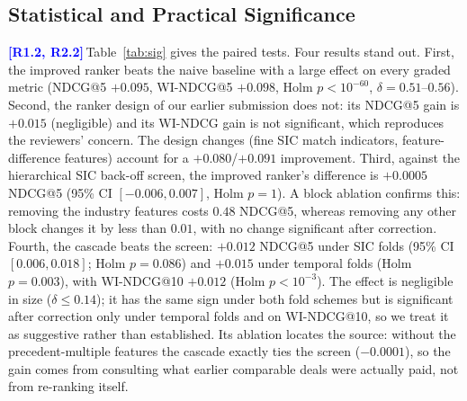 \documentclass[conference]{IEEEtran}
\newcommand{\rc}[1]{\textcolor{blue}{\textbf{[#1]}}\,}
\newcommand{\rc}[1]{}
\begin{document}
\subsection{Statistical and Practical Significance}
\label{sec:significance}

\rc{R1.2, R2.2}Table~\ref{tab:sig} gives the paired tests. Four results stand out. First, the improved ranker beats the naive baseline with a large effect on every graded metric (NDCG@5 $+0.095$, WI-NDCG@5 $+0.098$, Holm $p<10^{-60}$, $\delta=0.51$--$0.56$). Second, the ranker design of our earlier submission does not: its NDCG@5 gain is $+0.015$ (negligible) and its WI-NDCG gain is not significant, which reproduces the reviewers' concern. The design changes (fine SIC match indicators, feature-difference features) account for a $+0.080$/$+0.091$ improvement. Third, against the hierarchical SIC back-off screen, the improved ranker's difference is $+0.0005$ NDCG@5 (95\% CI $[-0.006, 0.007]$, Holm $p=1$). A block ablation confirms this: removing the industry features costs $0.48$ NDCG@5, whereas removing any other block changes it by less than $0.01$, with no change significant after correction. Fourth, the cascade beats the screen: $+0.012$ NDCG@5 under SIC folds (95\% CI $[0.006, 0.018]$; Holm $p=0.086$) and $+0.015$ under temporal folds (Holm $p=0.003$), with WI-NDCG@10 $+0.012$ (Holm $p<10^{-3}$). The effect is negligible in size ($\delta\le0.14$); it has the same sign under both fold schemes but is significant after correction only under temporal folds and on WI-NDCG@10, so we treat it as suggestive rather than established. Its ablation locates the source: without the precedent-multiple features the cascade exactly ties the screen ($-0.0001$), so the gain comes from consulting what earlier comparable deals were actually paid, not from re-ranking itself.
\end{document}
